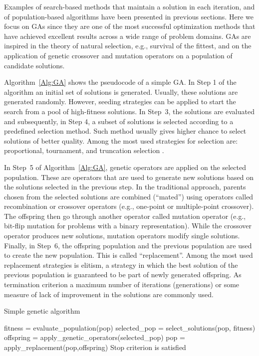  Examples of search-based methods that maintain a solution in each iteration, and of population-based algorithms have been presented in previous sections. Here we focus on  GAs  \cite{Goldberg:1989} since they are  one of the most successful optimization methods that have achieved excellent results across a wide range of problem domains. GAs are inspired in the theory of natural selection, e.g., survival of the fittest, and on the application of genetic crossover and mutation operators on a population of candidate solutions.

 Algorithm~\ref{Alg:GA} shows the pseudocode of a simple GA. In Step 1 of the algorithm an initial set of solutions is generated. Usually, these solutions are generated randomly. However, seeding strategies can be applied to start the search from a pool of high-fitness solutions. In Step~3, the solutions are evaluated and subsequently, in Step 4, a subset of solutions is selected according to a predefined selection method. Such method usually gives higher chance to select solutions of better quality. Among the most used strategies for selection are: proportional, tournament, and truncation selection \cite{Blickle_and_Thiele:1996}. 

 In Step~5 of Algorithm~\ref{Alg:GA},  genetic operators are applied on the selected population. These are operators that are used to generate new solutions based on the solutions selected in the previous step.  In the traditional approach, parents chosen from the selected solutions are combined (``mated'') using operators called recombination or crossover operators (e.g., one-point or multiple-point crossover). The offspring then go through another operator called mutation operator (e.g., bit-flip mutation for problems with a binary representation).  While the crossover operator produces new solutions, mutation operators modify single solutions. Finally, in Step~6, the offspring population and the previous population are used to create the new population. This is called ``replacement''.  Among the most used replacement strategies is elitism, a strategy in which the best solution of the previous population is guaranteed to be part of newly generated offspring. As termination criterion a  maximum number of iterations (generations) or some measure of lack of improvement in the solutions are commonly used. 

  \begin{algorithm}[ht!]
  \caption{Simple genetic algorithm}
   
    \begin{algorithmic}[1] 

      \REPEAT 
         \STATE  fitness = evaluate\_population(pop)
         \STATE  selected\_pop = select\_solutions(pop, fitness)
         \STATE  offspring = apply\_genetic\_operators(selected\_pop)
         \STATE  pop =  apply\_replacement(pop,offspring)
      \UNTIL Stop criterion is satisfied		
     \end{algorithmic}
	
 \label{Alg:GA}
  \end{algorithm}


